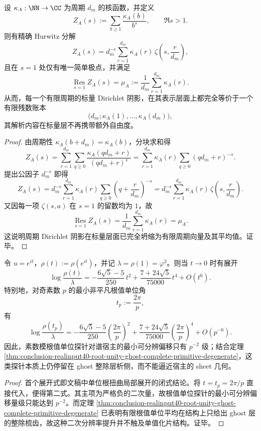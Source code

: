 \begin{theorem}\label{thm:conclusion-periodic-dirichlet-shadow-hurwitz-finite-closure}
设 \(\kappa_A:\NN\to\CC\) 为周期 \(d_m\) 的核函数，并定义
\[
Z_A(s):=\sum_{b\ge 1}\frac{\kappa_A(b)}{b^s},
\qquad \Re s>1.
\]
则有精确 Hurwitz 分解
\[
Z_A(s)=d_m^{-s}\sum_{r=1}^{d_m}\kappa_A(r)\,
\zeta\!\left(s,\frac{r}{d_m}\right),
\]
且在 \(s=1\) 处仅有唯一简单极点，并满足
\[
\operatorname*{Res}_{s=1}Z_A(s)
=
\mu_A
:=
\frac{1}{d_m}\sum_{r=1}^{d_m}\kappa_A(r).
\]
从而，每一个有限周期的标量 Dirichlet 阴影，在其表示层面上都完全等价于一个有限残数账本
\[
\bigl(d_m;\kappa_A(1),\dots,\kappa_A(d_m)\bigr),
\]
其解析内容在标量层不再携带额外自由度。
\end{theorem}
\begin{proof}
由周期性 \(\kappa_A(b+d_m)=\kappa_A(b)\)，分块求和得
\[
Z_A(s)
=
\sum_{r=1}^{d_m}\sum_{q\ge 0}\frac{\kappa_A(qd_m+r)}{(qd_m+r)^s}
=
\sum_{r=1}^{d_m}\kappa_A(r)\sum_{q\ge 0}(qd_m+r)^{-s}.
\]
提出公因子 \(d_m^{-s}\) 即得
\[
Z_A(s)
=
d_m^{-s}\sum_{r=1}^{d_m}\kappa_A(r)\sum_{q\ge 0}\left(q+\frac{r}{d_m}\right)^{-s}
=
d_m^{-s}\sum_{r=1}^{d_m}\kappa_A(r)\,
\zeta\!\left(s,\frac{r}{d_m}\right).
\]
又因每一项 \(\zeta(s,a)\) 在 \(s=1\) 的留数均为 \(1\)，故
\[
\operatorname*{Res}_{s=1}Z_A(s)
=
\frac{1}{d_m}\sum_{r=1}^{d_m}\kappa_A(r)
=
\mu_A.
\]
这说明周期 Dirichlet 阴影在标量层面已完全坍缩为有限周期向量及其平均值。证毕。
\end{proof}

\begin{proposition}[素数根值单位探针仅具二次分辨率]\label{prop:conclusion-prime-root-unity-probe-quadratic-resolution}
令 \(u=e^{it}\)，\(\rho(t):=\rho(e^{it})\)，并记 \(\lambda=\rho(1)=\varphi^2\)。则当 \(t\to 0\) 时有展开
\[
\log\frac{\rho(t)}{\lambda}
=
-\frac{6\sqrt5-5}{250}\,t^2
+\frac{7+24\sqrt5}{75000}\,t^4
+O(t^6).
\]
特别地，对奇素数 \(p\) 的最小非平凡根值单位角
\[
t_p:=\frac{2\pi}{p},
\]
有
\[
\log\frac{\rho(t_p)}{\lambda}
=
-\frac{6\sqrt5-5}{250}\left(\frac{2\pi}{p}\right)^2
+\frac{7+24\sqrt5}{75000}\left(\frac{2\pi}{p}\right)^4
+O(p^{-6}).
\]
因此，素数模根值单位探针对谱宿主的最小可分辨偏移只有 \(p^{-2}\) 级；结合定理 \ref{thm:conclusion-realinput40-root-unity-ghost-complete-primitive-degenerate}，这类探针本质上仍停留在 ghost 整除层析侧，而不能逼近宿主的 sheet 几何。
\end{proposition}
\begin{proof}
首个展开式即文稿中单位根扭曲局部展开的闭式结论。将 \(t=t_p=2\pi/p\) 直接代入，便得第二式。其主项为严格负的二次量，故根值单位探针的最小可分辨偏移量级只能达到 \(p^{-2}\)。而定理 \ref{thm:conclusion-realinput40-root-unity-ghost-complete-primitive-degenerate} 已表明有限根值单位平均在结构上只给出 ghost 层的整除梳齿，故这种二次分辨率提升并不触及单值化片结构。证毕。
\end{proof}
